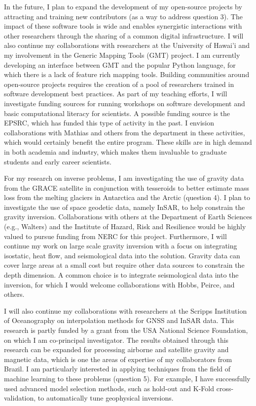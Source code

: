 \documentclass[12pt,notitlepage]{article}
\begin{document}
In the future, I plan to expand the development of my open-source projects by attracting
and training new contributors (as a way to address question 3).
The impact of these software tools is wide and enables synergistic interactions with
other researchers through the sharing of a common digital infrastructure.
I will also continue my collaborations with researchers at the University of Hawai'i
and my involvement in the Generic Mapping Tools (GMT) project.
I am currently developing an interface between GMT and the popular Python language,
for which there is a lack of feature rich mapping tools.
Building communities around open-source projects requires the creation of a pool of
researchers trained in software development best practices.
As part of my teaching efforts, I will investigate funding sources for running workshops
on software development and basic computational literacy for scientists.
A possible funding source is the EPSRC, which has funded this type of activity in the
past.
I envision collaborations with Mathias and others from the department in these
activities, which would certainly benefit the entire program.
These skills are in high demand in both academia and industry, which makes them
invaluable to graduate students and early career scientists.

For my research on inverse problems, I am investigating the use of gravity data from the
GRACE satellite in conjunction with tesseroids to better estimate mass loss from the
melting glaciers in Antarctica and the Arctic (question 4).
I plan to investigate the use of space geodetic data, namely InSAR, to help constrain
the gravity inversion.
Collaborations with others at the Department of Earth Sciences (e.g., Walters) and the
Institute of Hazard, Risk and Resilience would be highly valued to pursue funding from
NERC for this project.
Furthermore, I will continue my work on large scale gravity inversion with a focus on
integrating isostatic, heat flow, and seismological data into the solution.
Gravity data can cover large areas at a small cost but require other data sources to
constrain the depth dimension.
A common choice is to integrate seismological data into the inversion, for which I would
welcome collaborations with Hobbs, Peirce, and others.

I will also continue my collaborations with researchers at the Scripps Institution of
Oceanography on interpolation methods for GNSS and InSAR data. This research is partly
funded by a grant from the USA National Science Foundation, on which I am co-principal
investigator.
The results obtained through this research can be expanded for processing airborne and
satellite gravity and magnetic data, which is one the areas of expertise of my
collaborators from Brazil.
I am particularly interested in applying techniques from the field of machine learning
to these problems (question 5).
For example, I have successfully used advanced model selection methods, such as hold-out
and K-Fold cross-validation, to automatically tune geophysical inversions.
\end{document}
